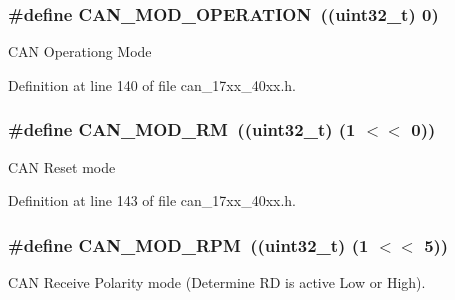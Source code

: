 \subsubsection[{\texorpdfstring{C\+A\+N\+\_\+\+M\+O\+D\+\_\+\+O\+P\+E\+R\+A\+T\+I\+ON}{CAN_MOD_OPERATION}}]{\setlength{\rightskip}{0pt plus 5cm}\#define C\+A\+N\+\_\+\+M\+O\+D\+\_\+\+O\+P\+E\+R\+A\+T\+I\+ON~((uint32\+\_\+t) 0)}\hypertarget{group__CAN__17XX__40XX_gac47f17c3134b87bbabc990411f21049d}{}\label{group__CAN__17XX__40XX_gac47f17c3134b87bbabc990411f21049d}
C\+AN Operationg Mode 

Definition at line 140 of file can\+\_\+17xx\+\_\+40xx.\+h.

\subsubsection[{\texorpdfstring{C\+A\+N\+\_\+\+M\+O\+D\+\_\+\+RM}{CAN_MOD_RM}}]{\setlength{\rightskip}{0pt plus 5cm}\#define C\+A\+N\+\_\+\+M\+O\+D\+\_\+\+RM~((uint32\+\_\+t) (1 $<$$<$ 0))}\hypertarget{group__CAN__17XX__40XX_gafd10049f6c1d6a63bfb481578d97de16}{}\label{group__CAN__17XX__40XX_gafd10049f6c1d6a63bfb481578d97de16}
C\+AN Reset mode 

Definition at line 143 of file can\+\_\+17xx\+\_\+40xx.\+h.

\subsubsection[{\texorpdfstring{C\+A\+N\+\_\+\+M\+O\+D\+\_\+\+R\+PM}{CAN_MOD_RPM}}]{\setlength{\rightskip}{0pt plus 5cm}\#define C\+A\+N\+\_\+\+M\+O\+D\+\_\+\+R\+PM~((uint32\+\_\+t) (1 $<$$<$ 5))}\hypertarget{group__CAN__17XX__40XX_gaec973a15597675e749f4033835dd66f9}{}\label{group__CAN__17XX__40XX_gaec973a15597675e749f4033835dd66f9}
C\+AN Receive Polarity mode (Determine RD is active Low or High). 

